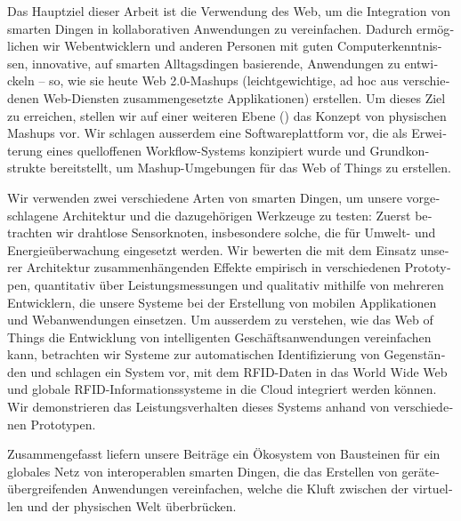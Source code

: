 \begin{otherlanguage}{ngerman}
Das Hauptziel dieser Arbeit ist die Verwendung des Web, um die Integration von smarten Dingen in kollaborativen Anwendungen zu vereinfachen. Dadurch erm\"{o}glichen wir Webentwicklern und anderen Personen mit guten Computerkenntnissen, innovative, auf smarten Alltagsdingen basierende, Anwendungen zu entwickeln -- so, wie sie heute Web 2.0-Mashups (leichtgewichtige, ad hoc aus verschiedenen Web-Diensten zusammengesetzte Applikationen) erstellen. Um dieses Ziel zu erreichen, stellen wir auf einer weiteren Ebene () das Konzept von physischen Mashups vor. Wir schlagen ausserdem eine Softwareplattform vor, die als Erweiterung eines quelloffenen Workflow-Systems konzipiert wurde und Grundkonstrukte bereitstellt, um Mashup-Umgebungen f\"{u}r das Web of Things zu erstellen.

Wir verwenden zwei verschiedene Arten von smarten Dingen, um unsere vorgeschlagene Architektur und die dazugeh\"{o}rigen Werkzeuge zu testen: Zuerst betrachten wir drahtlose Sensorknoten, insbesondere solche, die f\"{u}r Umwelt- und Energie\"{u}berwachung eingesetzt werden. Wir bewerten die mit dem Einsatz unserer Architektur zusammenh\"{a}ngenden Effekte empirisch in verschiedenen Prototypen, quantitativ \"{u}ber Leistungsmessungen und qualitativ mithilfe von mehreren Entwicklern, die unsere Systeme bei der Erstellung von mobilen Applikationen und Webanwendungen einsetzen. Um ausserdem zu verstehen, wie das Web of Things die Entwicklung von intelligenten Gesch\"{a}ftsanwendungen vereinfachen kann, betrachten wir Systeme zur automatischen Identifizierung von Gegenst\"{a}nden und schlagen ein System vor, mit dem RFID-Daten in das World Wide Web und globale RFID-Informationssysteme in die Cloud integriert werden k\"{o}nnen. Wir demonstrieren das Leistungsverhalten dieses Systems anhand von verschiedenen Prototypen.

Zusammengefasst liefern unsere Beitr\"{a}ge ein \"{O}kosystem von Bausteinen f\"{u}r ein globales Netz von interoperablen smarten Dingen, die das Erstellen von ger\"{a}te\-\"{u}bergreifenden Anwendungen vereinfachen, welche die Kluft zwischen der virtuellen und der physischen Welt \"{u}berbr\"{u}cken.
\end{otherlanguage}